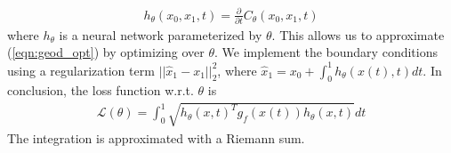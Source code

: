 \documentclass{article}
\theoremstyle{plain}
\theoremstyle{definition}
\theoremstyle{remark}
\newcommand{\xin}[1]{\textcolor{teal}{[XS: #1]}}
\begin{document}
\begin{align}
    h_\theta(x_0,x_1,t)=\frac{\partial}{\partial t}C_\theta(x_0,x_1,t)
\end{align}
where $h_\theta$ is a neural network parameterized by $\theta$. This allows us to approximate (\ref{eqn:geod_opt}) by optimizing over $\theta$. We implement the boundary conditions using a regularization term $||\hat x_1-x_1||^2_2$, where $\hat x_1=x_0+\int_{0}^{1}h_\theta(x(t),t)dt$.
In conclusion, the loss function w.r.t. $\theta$ is
\begin{align}
    \mathcal L(\theta)=\int_{0}^{1}\sqrt{h_\theta(x,t)^T g_f(x(t))h_\theta(x,t)}dt
\end{align}
The integration is approximated with a Riemann sum.


\end{document}
